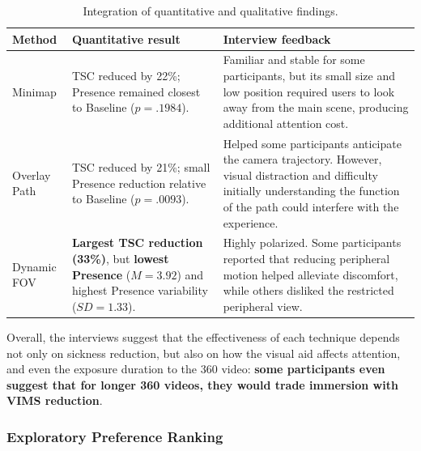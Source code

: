 \begin{table}[t]
    \centering
    \caption{Integration of quantitative and qualitative findings.}
    \label{tab:study1-mixed-methods}
    \small
    \begin{tabular}{
        p{}
        p{}
        p{}}
        \toprule

        \textbf{Method}
        & \textbf{Quantitative result}
        & \textbf{Interview feedback} \\

        \midrule

        Minimap
        &
        TSC reduced by 22\%; Presence remained closest to Baseline ($p=.1984$).
        &
        Familiar and stable for some participants, but its small size and low position required users to look away from the main scene, producing additional attention cost. \\

        Overlay Path
        &
        TSC reduced by 21\%; small Presence reduction relative to Baseline ($p=.0093$).
        &
        Helped some participants anticipate the camera trajectory. However, visual distraction and difficulty initially understanding the function of the path could interfere with the experience. \\

        Dynamic FOV
        &
        \textbf{Largest TSC reduction (33\%)}, but \textbf{lowest Presence} ($M=3.92$) and highest Presence variability ($SD=1.33$).
        &
        Highly polarized. Some participants reported that reducing peripheral motion helped alleviate discomfort, while others disliked the restricted peripheral view. \\

        \bottomrule
    \end{tabular}
\end{table}

Overall, the interviews suggest that the effectiveness of each technique depends not only on sickness reduction, but also on how the visual aid affects attention, and even the exposure duration to the 360 video: \textbf{some participants even suggest that for longer 360 videos, they would trade immersion with VIMS reduction}. 


\subsubsection{Exploratory Preference Ranking}

